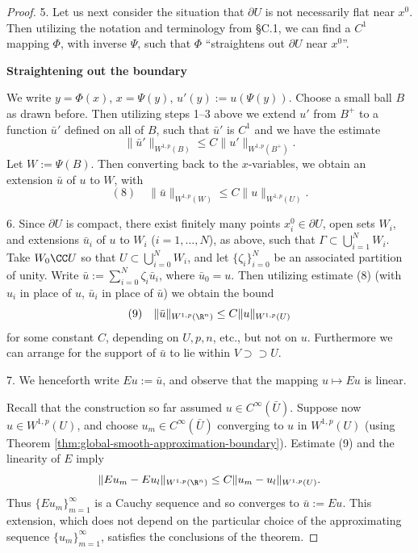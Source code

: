 \begin{proof}
5. Let us next consider the situation that $\partial U$ is not necessarily flat near $x^0$. Then utilizing the notation and terminology from §C.1, we can find a $C^1$ mapping $\Phi$, with inverse $\Psi$, such that $\Phi$ ``straightens out $\partial U$ near $x^0$''.

\begin{figure}[h]\centering
\end{figure}

\textbf{Straightening out the boundary}

We write $y = \Phi(x)$, $x = \Psi(y)$, $u'(y) := u(\Psi(y))$. Choose a small ball $B$ as drawn before. Then utilizing steps 1--3 above we extend $u'$ from $B^+$ to a function $\bar u'$ defined on all of $B$, such that $\bar u'$ is $C^1$ and we have the estimate
$$\|\bar u'\|_{W^{1,p}(B)} \le C\|u'\|_{W^{1,p}(B^+)}.$$
Let $W := \Psi(B)$. Then converting back to the $x$-variables, we obtain an extension $\bar u$ of $u$ to $W$, with
$$(8) \quad \|\bar u\|_{W^{1,p}(W)} \le C\|u\|_{W^{1,p}(U)}.$$

6. Since $\partial U$ is compact, there exist finitely many points $x_i^0 \in \partial U$, open sets $W_i$, and extensions $\bar u_i$ of $u$ to $W_i$ ($i = 1,\ldots,N$), as above, such that $\Gamma \subset \bigcup_{i=1}^N W_i$. Take $W_0 \CC U$ so that $U \subset \bigcup_{i=0}^N W_i$, and let $\{\zeta_i\}_{i=0}^N$ be an associated partition of unity. Write $\bar u := \sum_{i=0}^N \zeta_i \bar u_i$, where $\bar u_0 = u$. Then utilizing estimate (8) (with $u_i$ in place of $u$, $\bar u_i$ in place of $\bar u$) we obtain the bound
$$(9) \quad \|\bar u\|_{W^{1,p}(\R^n)} \le C\|u\|_{W^{1,p}(U)}$$
for some constant $C$, depending on $U,p,n$, etc., but not on $u$. Furthermore we can arrange for the support of $\bar u$ to lie within $V \supset\supset U$.

7. We henceforth write $Eu := \bar{u}$, and observe that the mapping $u \mapsto Eu$ is linear.

Recall that the construction so far assumed $u \in C^\infty(\bar{U})$. Suppose now $u \in W^{1,p}(U)$, and choose $u_m \in C^\infty(\bar{U})$ converging to $u$ in $W^{1,p}(U)$ (using Theorem \ref{thm:global-smooth-approximation-boundary}). Estimate (9) and the linearity of $E$ imply
$$\|Eu_m - Eu_l\|_{W^{1,p}(\R^n)} \le C\|u_m - u_l\|_{W^{1,p}(U)}.$$
Thus $\{Eu_m\}_{m=1}^\infty$ is a Cauchy sequence and so converges to $\bar{u} := Eu$. This extension, which does not depend on the particular choice of the approximating sequence $\{u_m\}_{m=1}^\infty$, satisfies the conclusions of the theorem.
\end{proof}

